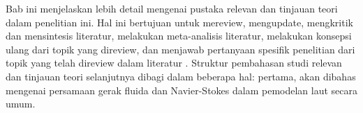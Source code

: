 \vspace{1.5pc}
\begin{spacing}{1.5}
	
	Bab ini menjelaskan lebih detail mengenai pustaka relevan dan tinjauan teori dalam penelitian ini. Hal ini bertujuan untuk mereview, mengupdate, mengkritik dan mensintesis literatur, melakukan meta-analisis literatur, melakukan konsepsi ulang dari topik yang direview, dan menjawab pertanyaan spesifik penelitian dari topik yang telah direview dalam literatur . Struktur pembahasan studi relevan dan tinjauan teori selanjutnya dibagi dalam beberapa hal: pertama, akan dibahas mengenai persamaan gerak fluida dan Navier-Stokes dalam pemodelan laut secara umum.
	
	
\end{spacing}
\vspace{-0.1pc}
